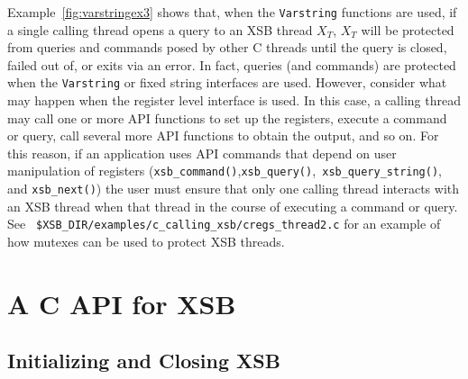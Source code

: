 Example~\ref{fig:varstringex3} shows that, when the {\tt Varstring}
functions are used, if a single calling thread opens a query to an XSB
thread $X_T$, $X_T$ will be protected from queries and commands posed
by other C threads until the query is closed, failed out of, or exits
via an error.  In fact, queries (and commands) are protected when the
{\tt Varstring} or fixed string interfaces are used.  However,
consider what may happen when the register level interface is used.
In this case, a calling thread may call one or more API functions to
set up the registers, execute a command or query, call several more
API functions to obtain the output, and so on.  For this reason, if an
application uses API commands that depend on user manipulation of
registers ({\tt xsb\_command()},{\tt xsb\_query()},{\tt
  xsb\_query\_string()}, and {\tt xsb\_next()}) the user must ensure
that only one calling thread interacts with an XSB thread when that
thread in the course of executing a command or query.  See {\tt
  \$XSB\_DIR/examples/c\_calling\_xsb/cregs\_thread2.c} for an example
of how mutexes can be used to protect XSB threads.


\section{A C API for XSB} \label{sec:CAPI}
%
\subsection{Initializing and Closing XSB}

